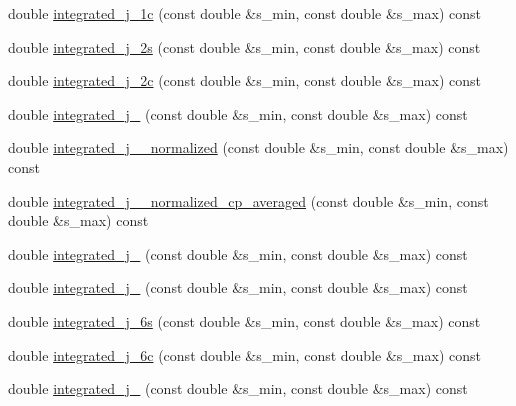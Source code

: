 \begin{DoxyCompactItemize}
\item 
double \hyperlink{classeos_1_1BToKstarDilepton_3_01LowRecoil_01_4_a5d9d3e3290c20f4a7019bf449f6b0e62}{integrated\_\-j\_\-1c} (const double \&s\_\-min, const double \&s\_\-max) const 
\item 
double \hyperlink{classeos_1_1BToKstarDilepton_3_01LowRecoil_01_4_a69e2a4fa81e024ea433f7d1924bf261d}{integrated\_\-j\_\-2s} (const double \&s\_\-min, const double \&s\_\-max) const 
\item 
double \hyperlink{classeos_1_1BToKstarDilepton_3_01LowRecoil_01_4_a6f81a72ab27c25c1f0946eb58ac037f5}{integrated\_\-j\_\-2c} (const double \&s\_\-min, const double \&s\_\-max) const 
\item 
double \hyperlink{classeos_1_1BToKstarDilepton_3_01LowRecoil_01_4_ac5480bfbfb3883f97567564100ed6ac4}{integrated\_\-j\_} (const double \&s\_\-min, const double \&s\_\-max) const 
\item 
double \hyperlink{classeos_1_1BToKstarDilepton_3_01LowRecoil_01_4_ae8c6009d0de2040febb7fadaf6d364c2}{integrated\_\-j\_\_\-normalized} (const double \&s\_\-min, const double \&s\_\-max) const 
\item 
double \hyperlink{classeos_1_1BToKstarDilepton_3_01LowRecoil_01_4_a042d95c0b797000c2214bb41a7253d4d}{integrated\_\-j\_\_\-normalized\_\-cp\_\-averaged} (const double \&s\_\-min, const double \&s\_\-max) const 
\item 
double \hyperlink{classeos_1_1BToKstarDilepton_3_01LowRecoil_01_4_a2b22b8cc8d7a2546ea18ff056a2e8ca2}{integrated\_\-j\_} (const double \&s\_\-min, const double \&s\_\-max) const 
\item 
double \hyperlink{classeos_1_1BToKstarDilepton_3_01LowRecoil_01_4_af7e6c518a032eccad0f96a766216e55f}{integrated\_\-j\_} (const double \&s\_\-min, const double \&s\_\-max) const 
\item 
double \hyperlink{classeos_1_1BToKstarDilepton_3_01LowRecoil_01_4_a1c86b7c7225aea0d22cebf316234b031}{integrated\_\-j\_\-6s} (const double \&s\_\-min, const double \&s\_\-max) const 
\item 
double \hyperlink{classeos_1_1BToKstarDilepton_3_01LowRecoil_01_4_a058b5fc3819fa4db3670a5c6bce2c950}{integrated\_\-j\_\-6c} (const double \&s\_\-min, const double \&s\_\-max) const 
\item 
double \hyperlink{classeos_1_1BToKstarDilepton_3_01LowRecoil_01_4_a9864625ce8aa2f4d1170ac1e1d4ed7f0}{integrated\_\-j\_} (const double \&s\_\-min, const double \&s\_\-max) const 
\item 

\end{DoxyCompactItemize}
